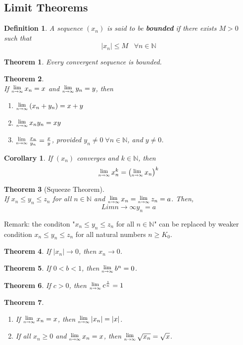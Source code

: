 \documentclass[8pt]{article}
\newcommand{\Lim}[1]{\raisebox{0.5ex}{\scalebox{0.8}{$\displaystyle \lim_{#1}\;$}}}
\newtheorem{definition}{Definition}[section]
\newtheorem{theorem}{Theorem}[section]
\newtheorem{corollary}{Corollary}[section]
\theoremstyle{definition}
\begin{document}
\subsection{Limit Theorems}
\begin{definition}\normalfont A sequence $(x_n)$ is said to be \textbf{bounded} if there exists $M>0$ such that
\[
|x_n|\leq M\;\;\;\forall n\in\mathbb{N}
\]
\end{definition}
\begin{theorem}\normalfont Every convergent sequence is bounded.\end{theorem}
\begin{theorem}
\hfill\\\normalfont If $\Lim{n\to\infty}x_n=x$ and $\Lim{n\to\infty}y_n = y$, then
\begin{enumerate}
\item $\Lim{n\to\infty}(x_n+y_n)=x+y$
\item $\Lim{n\to\infty} x_n y_n = xy$
\item $\Lim{n\to\infty}\frac{x_n}{y_n}=\frac{x}{y}$, provided $y_n\neq 0\;\forall n\in\mathbb{N}$, and $y\neq 0$.
\end{enumerate}
\end{theorem}
\begin{corollary}\normalfont If $(x_n)$ converges and $k\in\mathbb{N}$, then
\[
\Lim{n\to\infty}x^k_n=\left(\Lim{n\to\infty}x_n\right)^k
\]
\end{corollary}
\begin{theorem}[Squeeze Theorem]
\hfill\\\normalfont If $x_n\leq y_n\leq z_n$ for all $n\in \mathbb{N}$ and $\Lim{n\to \infty}x_n=\Lim{n\to\infty}z_n = a$. Then,
\[
Lim{n\to\infty} y_n =a
\]
\end{theorem}
Remark: the conditon "$x_n\leq y_n\leq z_n$ for all $n\in \mathbb{N}$" can be replaced by weaker condition $x_n\leq y_n \leq z_n$ for all natural numbers $n\geq K_0$.
\begin{theorem}
\normalfont If $|x_n|\to 0$, then $x_n\to 0$.
\end{theorem}
\begin{theorem}
\normalfont If $0<b<1$, then $\Lim{n\to\infty} b^n=0$.
\end{theorem}
\begin{theorem}
\normalfont If $c>0$, then $\Lim{n\to\infty}c^\frac{1}{n}=1$
\end{theorem}
\begin{theorem}
\normalfont
\begin{enumerate}
\item If $\Lim{n\to\infty}x_n= x$, then $\Lim{n\to\infty}|x_n|= |x|$.
\item If all $x_n\geq 0$ and $\Lim{n\to\infty}x_n = x$, then $\Lim{n\to\infty}\sqrt{x_n}=\sqrt{x}$.
\end{enumerate}
\end{theorem}
\end{document}
